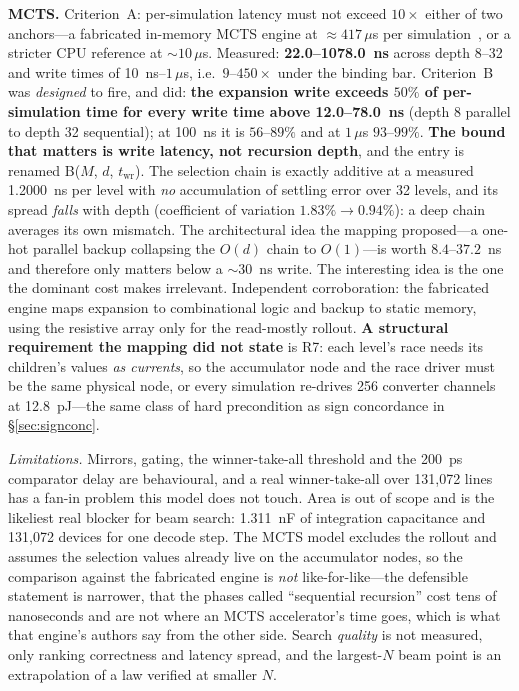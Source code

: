 \documentclass[11pt]{article}
\begin{document}
\textbf{MCTS.} Criterion~A: per-simulation latency must not exceed $10\times$ either of two anchors---a fabricated in-memory MCTS engine at ${\approx}417\,\mu$s per simulation~\cite{molomochir2026}, or a stricter CPU reference at ${\sim}10\,\mu$s. Measured: \textbf{22.0--1078.0~ns} across depth 8--32 and write times of 10~ns--$1\,\mu$s, i.e.\ $9$--$450\times$ under the binding bar. Criterion~B was \textit{designed} to fire, and did: \textbf{the expansion write exceeds $50\%$ of per-simulation time for every write time above 12.0--78.0~ns} (depth 8 parallel to depth 32 sequential); at 100~ns it is $56$--$89\%$ and at $1\,\mu$s $93$--$99\%$. \textbf{The bound that matters is write latency, not recursion depth}, and the entry is renamed B($M$, $d$, $t_{\mathrm{wr}}$). The selection chain is exactly additive at a measured 1.2000~ns per level with \textit{no} accumulation of settling error over 32 levels, and its spread \textit{falls} with depth (coefficient of variation $1.83\% \to 0.94\%$): a deep chain averages its own mismatch. The architectural idea the mapping proposed---a one-hot parallel backup collapsing the $O(d)$ chain to $O(1)$---is worth $8.4$--$37.2$~ns and therefore only matters below a ${\sim}30$~ns write. The interesting idea is the one the dominant cost makes irrelevant. Independent corroboration: the fabricated engine maps expansion to combinational logic and backup to static memory, using the resistive array only for the read-mostly rollout. \textbf{A structural requirement the mapping did not state} is R7: each level's race needs its children's values \textit{as currents}, so the accumulator node and the race driver must be the same physical node, or every simulation re-drives 256 converter channels at 12.8~pJ---the same class of hard precondition as sign concordance in \S\ref{sec:signconc}.

\textit{Limitations.} Mirrors, gating, the winner-take-all threshold and the 200~ps comparator delay are behavioural, and a real winner-take-all over 131{,}072 lines has a fan-in problem this model does not touch. Area is out of scope and is the likeliest real blocker for beam search: 1.311~nF of integration capacitance and 131{,}072 devices for one decode step. The MCTS model excludes the rollout and assumes the selection values already live on the accumulator nodes, so the comparison against the fabricated engine is \textit{not} like-for-like---the defensible statement is narrower, that the phases called ``sequential recursion'' cost tens of nanoseconds and are not where an MCTS accelerator's time goes, which is what that engine's authors say from the other side. Search \textit{quality} is not measured, only ranking correctness and latency spread, and the largest-$N$ beam point is an extrapolation of a law verified at smaller $N$.
\end{document}
